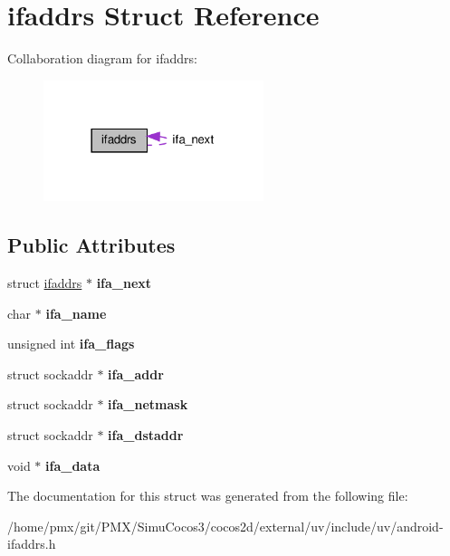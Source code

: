 \hypertarget{structifaddrs}{}\section{ifaddrs Struct Reference}
\label{structifaddrs}


Collaboration diagram for ifaddrs\+:
\nopagebreak
\begin{figure}[H]
\begin{center}
\leavevmode
\includegraphics[width=182pt]{structifaddrs__coll__graph}
\end{center}
\end{figure}
\subsection*{Public Attributes}
\begin{DoxyCompactItemize}
\item 
\mbox{\label{structifaddrs_a56ad9ba85e2c8f8634b8f15fc53b6447}} 
struct \hyperlink{structifaddrs}{ifaddrs} $\ast$ {\bfseries ifa\+\_\+next}
\item 
\mbox{\label{structifaddrs_a15b0944beb947aaef5e8532635889f6f}} 
char $\ast$ {\bfseries ifa\+\_\+name}
\item 
\mbox{\label{structifaddrs_a156cc3214646519277ac6be2d66fcc2b}} 
unsigned int {\bfseries ifa\+\_\+flags}
\item 
\mbox{\label{structifaddrs_a12d148f51adf48cee024fc6204f42c94}} 
struct sockaddr $\ast$ {\bfseries ifa\+\_\+addr}
\item 
\mbox{\label{structifaddrs_acac3a8d7d40841c497bb55b9e42c41d5}} 
struct sockaddr $\ast$ {\bfseries ifa\+\_\+netmask}
\item 
\mbox{\label{structifaddrs_a88ea3026d4cc37547935f7d1425a42e4}} 
struct sockaddr $\ast$ {\bfseries ifa\+\_\+dstaddr}
\item 
\mbox{\label{structifaddrs_a7298836283614a0a469c8da1eabdabb9}} 
void $\ast$ {\bfseries ifa\+\_\+data}
\end{DoxyCompactItemize}


The documentation for this struct was generated from the following file\+:\begin{DoxyCompactItemize}
\item 
/home/pmx/git/\+P\+M\+X/\+Simu\+Cocos3/cocos2d/external/uv/include/uv/android-\/ifaddrs.\+h\end{DoxyCompactItemize}
